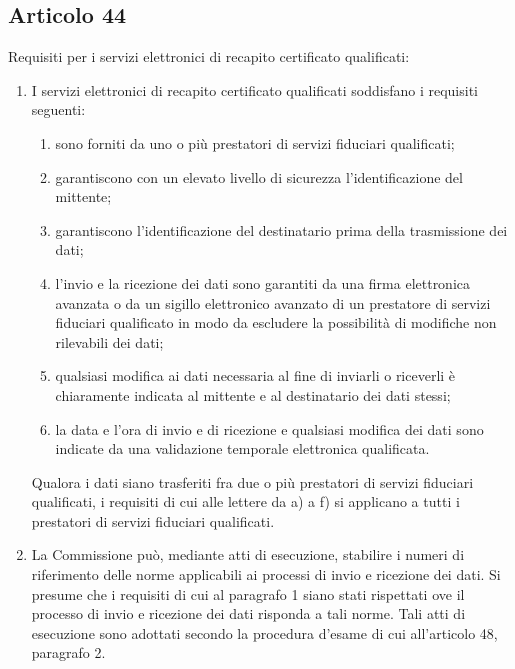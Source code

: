 \subsection*{Articolo 44}\label{sec:articolo44reg9102014}
Requisiti per i servizi elettronici di recapito certificato qualificati:
\begin{enumerate}
	\item I servizi elettronici di recapito certificato qualificati soddisfano i requisiti seguenti:
	\begin{enumerate}
		\item sono forniti da uno o più prestatori di servizi fiduciari qualificati;
		\item garantiscono con un elevato livello di sicurezza l’identificazione del mittente;
		\item garantiscono l’identificazione del destinatario prima della trasmissione dei dati;
		\item 	
		l’invio e la ricezione dei dati sono garantiti da una firma elettronica avanzata o da un sigillo elettronico avanzato di un prestatore di servizi fiduciari qualificato in modo da escludere la possibilità di modifiche non rilevabili dei dati;
		\item qualsiasi modifica ai dati necessaria al fine di inviarli o riceverli è chiaramente indicata al mittente e al destinatario dei dati stessi;
		\item la data e l’ora di invio e di ricezione e qualsiasi modifica dei dati sono indicate da una validazione temporale elettronica qualificata.
	\end{enumerate}
Qualora i dati siano trasferiti fra due o più prestatori di servizi fiduciari qualificati, i requisiti di cui alle lettere da a) a f) si applicano a tutti i prestatori di servizi fiduciari qualificati.
\item La Commissione può, mediante atti di esecuzione, stabilire i numeri di riferimento delle norme applicabili ai processi di invio e ricezione dei dati. Si presume che i requisiti di cui al paragrafo 1 siano stati rispettati ove il processo di invio e ricezione dei dati risponda a tali norme. Tali atti di esecuzione sono adottati secondo la procedura d’esame di cui all’articolo 48, paragrafo 2.
 \end{enumerate}
